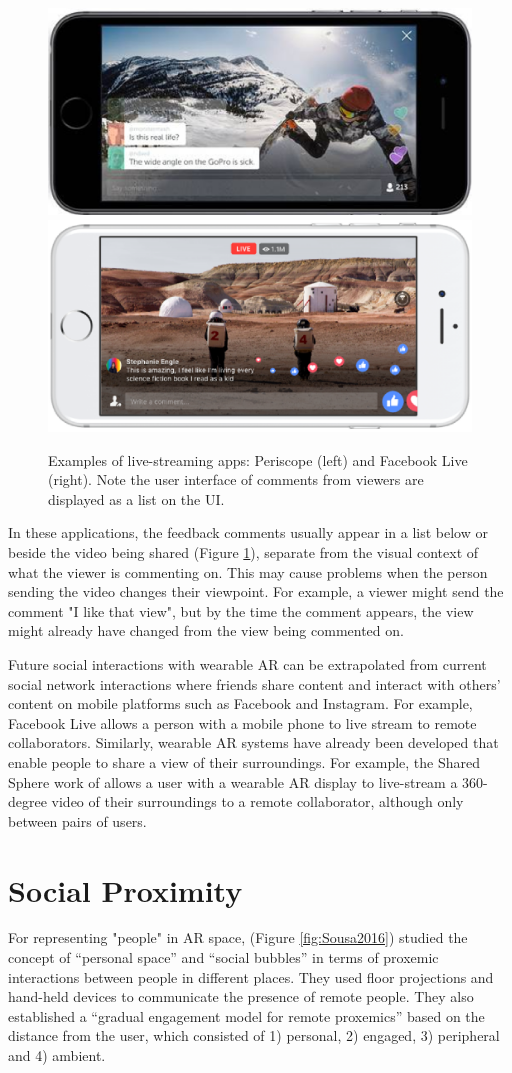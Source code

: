\begin{figure}
    \centering
    \includegraphics[width=0.4\linewidth]{images/20-background/periscope.eps}
    \includegraphics[width=0.4\linewidth]{images/20-background/facebook-live.eps}
    \caption{Examples of live-streaming apps: Periscope (left) and Facebook Live (right). Note the user interface of comments from viewers are displayed as a list on the UI.}
    \label{fig:live-streaming}
\end{figure}

In these applications, the feedback comments usually appear in a list below or beside the video being shared (Figure \ref{fig:live-streaming}), separate from the visual context of what the viewer is commenting on. This may cause problems when the person sending the video changes their viewpoint. For example, a viewer might send the comment "I like that view", but by the time the comment appears, the view might already have changed from the view being commented on.

Future social interactions with wearable AR can be extrapolated from current social network interactions where friends share content and interact with others' content on mobile platforms such as Facebook and Instagram. For example, Facebook Live allows a person with a mobile phone to live stream to remote collaborators. Similarly, wearable AR systems have already been developed that enable people to share a view of their surroundings. For example, the Shared Sphere work of \textcite{lee2017mixed} allows a user with a wearable AR display to live-stream a 360-degree video of their surroundings to a remote collaborator, although only between pairs of users. 

\section{Social Proximity}

For representing "people" in AR space, \textcite{Sousa2016} (Figure \ref{fig:Sousa2016}) studied the concept of \enquote{personal space} and \enquote{social bubbles} in terms of proxemic interactions between people in different places. They used floor projections and hand-held devices to communicate the presence of remote people. They also established a \enquote{gradual engagement model for remote proxemics} based on the distance from the user, which consisted of 1) personal, 2) engaged, 3) peripheral and 4) ambient.

